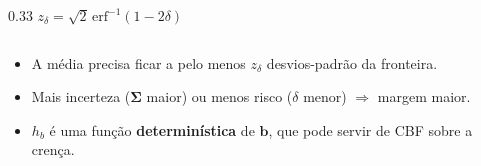 \begin{frame}
\begin{columns}[c]
\begin{column}{0.33\textwidth}
            {\tiny $z_\delta = \sqrt{2}\,\mathrm{erf}^{-1}(1-2\delta)$}
        \end{column}

    \end{columns}

    \begin{itemize}
        \item A média precisa ficar a pelo menos $z_\delta$ desvios-padrão da fronteira.
        \item Mais incerteza ($\boldsymbol{\Sigma}$ maior) ou menos risco ($\delta$ menor) $\Rightarrow$ margem maior.
        \item $h_b$ é uma função \textbf{determinística} de $\boldsymbol{b}$, que pode servir de CBF sobre a crença.
    \end{itemize}

\end{frame}
